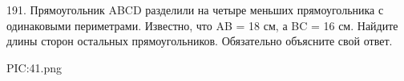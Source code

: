 191. Прямоугольник ABCD разделили на четыре меньших прямоугольника с одинаковыми периметрами. Известно, что AB = 18 см, а BC = 16 см. Найдите длины сторон остальных прямоугольников. Обязательно объясните свой ответ.
\begin{center}
{{PIC:41.png}}
\end{center}
